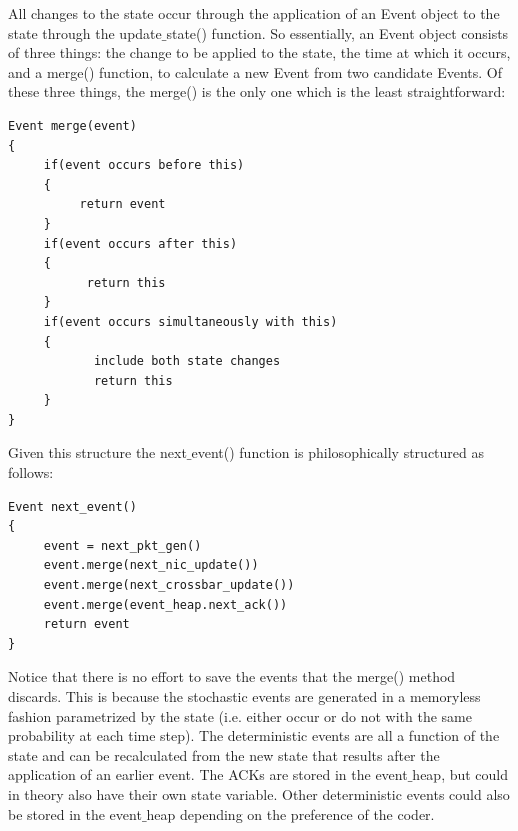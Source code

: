 \documentclass[11pt]{article}%
\begin{document}
All changes to the state occur through the application of an Event object to the state through the update$\_$state() function.  So essentially, an Event object consists of three things: the change to be applied to the state, the time at which it occurs, and a merge() function, to calculate a new Event from two candidate Events.  Of these three things, the merge() is the only one which is the least straightforward:
\begin{verbatim}
Event merge(event)
{
     if(event occurs before this)
     {
          return event
     }
     if(event occurs after this)
     {
           return this
     }
     if(event occurs simultaneously with this)
     {
            include both state changes
            return this
     }
}
\end{verbatim}

Given this structure the next$\_$event() function is philosophically structured as follows:

\begin{verbatim}
Event next_event()
{
     event = next_pkt_gen()
     event.merge(next_nic_update())
     event.merge(next_crossbar_update())
     event.merge(event_heap.next_ack())
     return event
}
\end{verbatim}

Notice that there is no effort to save the events that the merge() method discards.  This is because the stochastic events are generated in a memoryless fashion parametrized by the state (i.e. either occur or do not with the same probability at each time step).  The deterministic events are all a function of the state and can be recalculated from the new state that results after the application of an earlier event.  The ACKs are stored in the event$\_$heap, but could in theory also have their own state variable.  Other deterministic events could also be stored in the event$\_$heap depending on the preference of the coder.
\end{document}

